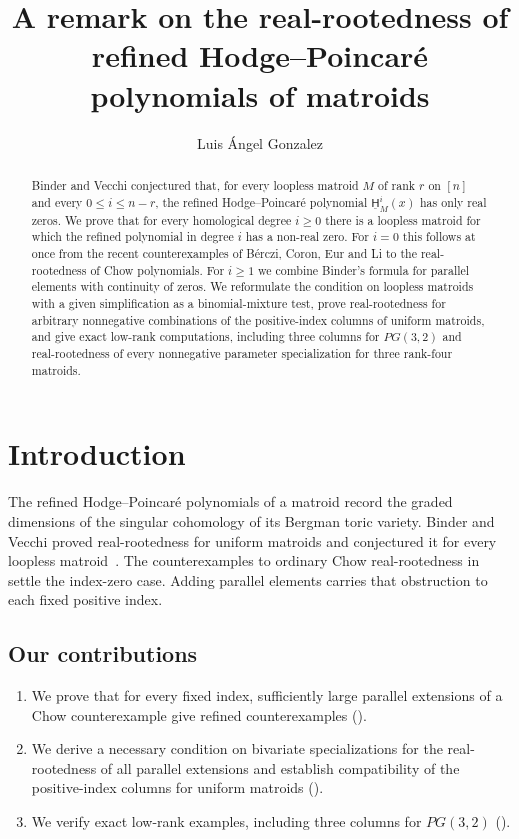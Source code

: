 \documentclass[a4paper,envcountsame,runningheads]{llncs}
\title{A remark on the real-rootedness of refined Hodge--Poincar\'e polynomials of matroids}
\author{Luis \'Angel Gonzalez}
\institute{Ring0 Labs\\\email{angel@r-0.org} \textperiodcentered{} AI Swarms\\Published by Lugel Labs}
\newcommand{\uH}{\underline{\mathsf H}}
\begin{document}
\raggedbottom
\maketitle
\thispagestyle{plain}
\begin{abstract}
Binder and Vecchi conjectured that, for every loopless matroid $M$ of rank $r$ on $[n]$ and every $0\le i\le n-r$, the refined Hodge--Poincar\'e polynomial $\uH^i_M(x)$ has only real zeros. We prove that for every homological degree $i\geq 0$ there is a loopless matroid for which the refined polynomial in degree $i$ has a non-real zero. For $i=0$ this follows at once from the recent counterexamples of B\'erczi, Coron, Eur and Li to the real-rootedness of Chow polynomials. For $i\ge 1$ we combine Binder's formula for parallel elements with continuity of zeros. We reformulate the condition on loopless matroids with a given simplification as a binomial-mixture test, prove real-rootedness for arbitrary nonnegative combinations of the positive-index columns of uniform matroids, and give exact low-rank computations, including three columns for $PG(3,2)$ and real-rootedness of every nonnegative parameter specialization for three rank-four matroids.
\end{abstract}

\section{Introduction}

The refined Hodge--Poincar\'e polynomials of a matroid record the graded dimensions of the singular cohomology of its Bergman toric variety. Binder and Vecchi proved real-rootedness for uniform matroids and conjectured it for every loopless matroid~\cite[Theorem~1.4 and Conjecture~1.5]{BV}. The counterexamples to ordinary Chow real-rootedness in~\cite[Theorem~C]{BCEL} settle the index-zero case. Adding parallel elements carries that obstruction to each fixed positive index.

\subsection{Our contributions}
\begin{enumerate}
\item We prove that for every fixed index, sufficiently large parallel extensions of a Chow counterexample give refined counterexamples ().
\item We derive a necessary condition on bivariate specializations for the real-rootedness of all parallel extensions and establish compatibility of the positive-index columns for uniform matroids ().
\item We verify exact low-rank examples, including three columns for $PG(3,2)$ ().
\end{enumerate}
\end{document}
